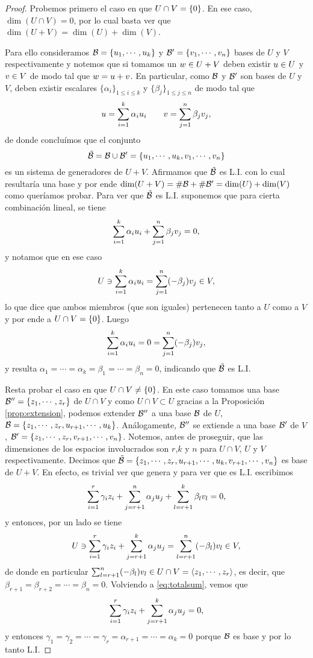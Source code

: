 \begin{proof}
Probemos primero el caso en que $U\cap V=\{\cero\}$. En ese caso, $\dim(U\cap V)=0$, por lo cual basta ver que $\dim(U+ V)=\dim(U)+\dim(V)$.

Para ello consideramos $\B=\{\ub_1,\cdots,\ub_k\}$ y $\B'=\{\vb_1,\cdots,\vb_n\}$ bases de $U$ y $V$ respectivamente y notemos que si tomamos un $\wb \in U+V$ deben existir $\ub \in U$ y $\vb\in V$ de modo tal que $\wb=\ub+\vb$. En particular, como $\mathcal B$ y $\mathcal B'$ son bases de $U$ y $V$,  deben existir escalares $\{\alpha_i\}_{1\le i\le k}$ y $\{\beta_j\}_{1\le j\le n}$ de modo tal que
$$
\ub= \sum_{i=1}^k\alpha_i\ub_i \qquad \vb=\sum_{j=1}^n\beta_j\vb_j,
$$
de donde conclu\'imos que el conjunto
$$\tilde{\B}=\B\cup \B'=\{ \ub_1,\cdots,\ub_k, \vb_1,\cdots,\vb_n\}$$
es un sistema de generadores de $U+V$. Afirmamos que $\tilde{\mathcal B}$ es L.I. con lo cual resultaría una base y por ende $\dim(U+V)=\# \mathcal B + \#\mathcal B'=\dim(U)+\dim(V)$ como queríamos probar. Para ver que $\tilde{\mathcal B}$ es L.I. suponemos que para cierta combinación lineal, se tiene
$$
\sum_{i=1}^k\alpha_i\ub_i + \sum_{j=1}^n\beta_j\vb_j=\cero,
$$
y notamos que en ese caso
$$
 U \ni \sum_{i=1}^k\alpha_i\ub_i = \sum_{j=1}^n(-\beta_j)\vb_j \in V,
$$
lo que dice que ambos miembros (que son iguales) pertenecen tanto a $U$ como a $V$ y por ende a $U\cap V=\{\cero\}$. Luego
$$
\sum_{i=1}^k\alpha_i\ub_i = \cero= \sum_{j=1}^n(-\beta_j)\vb_j,
$$
y resulta $\alpha_1=\cdots=\alpha_k=\beta_1=\cdots=\beta_n=0$, indicando que $\tilde{\mathcal B}$ es L.I.

Resta probar el caso en que $U\cap V\neq \{\cero\}$. En este caso tomamos una base
$\B''=\{\zb_1,\cdots,\zb_r\}$ de $U\cap V$ y como $U\cap V\subset U$ gracias a la Proposición \ref{prop:extension}, podemos extender $\mathcal B''$ a una base $\mathcal B$ de $U$,
$\B=\{\zb_1,\cdots,\zb_r, \ub_{r+1},\cdots, \ub_k \}$.  Análogamente, $\mathcal B''$ se extiende a una base $\mathcal B'$ de $V$, $\B'=\{\zb_1,\cdots,\zb_r, \vb_{r+1},\cdots, \vb_n\}$.  Notemos, antes de proseguir, que las dimensiones de los espacios involucrados son $r$,$k$ y $n$ para  $U\cap V$, $U$ y $V$ respectivamente. Decimos que
 $\tilde{\B}=\{\zb_1,\cdots,\zb_r,\ub_{r+1},\cdots, \ub_k, \vb_{r+1},\cdots, \vb_n\}$ es base de $U+V$. En efecto, es trivial ver que genera y para ver que es L.I. escribimos
 $$
 \sum_{i=1}^r\gamma_i \zb_i +\sum_{j=r+1}^{n}\alpha_j \ub_j +\sum_{l=r+1}^{k}\beta_l \vb_l = \cero,
 $$
 y entonces, por un lado se tiene
 \begin{equation}
 \label{eq:totalsum}
U \ni  \sum_{i=1}^r\gamma_i \zb_i +\sum_{j=r+1}^{k}\alpha_j \ub_j =\sum_{l=r+1}^{n}(-\beta_l) \vb_l \in V,
 \end{equation}
 de donde en particular
 $\sum_{l=r+1}^{n}(-\beta_l) \vb_l \in U\cap V = \langle \zb_1,\cdots,\zb_r \rangle$, es decir, que $\beta_{r+1}=\beta_{r+2}=\cdots = \beta_n=0$.  Volviendo a \eqref{eq:totalsum}, vemos
 que
  $$
  \sum_{i=1}^r\gamma_i \zb_i +\sum_{j=r+1}^{k}\alpha_j \ub_j=\cero,
  $$
  y entonces
  $\gamma_1=\gamma_2=\cdots=\gamma_r=\alpha_{r+1}=\cdots=\alpha_{k}=0$ porque
  $\mathcal B$ es base y por lo tanto L.I.


\end{proof}
